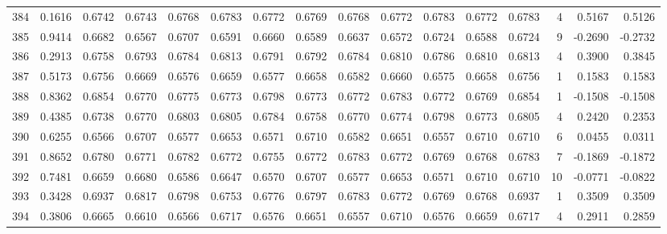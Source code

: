 \begin{tabular}{lrrrrrrrrrrrrrrr}
384 &      0.1616 &  0.6742 &  0.6743 &  0.6768 &  0.6783 &  0.6772 &  0.6769 &  0.6768 &  0.6772 &  0.6783 &   0.6772 &     0.6783 &      4 &                    0.5167 &                     0.5126 \\
385 &      0.9414 &  0.6682 &  0.6567 &  0.6707 &  0.6591 &  0.6660 &  0.6589 &  0.6637 &  0.6572 &  0.6724 &   0.6588 &     0.6724 &      9 &                   -0.2690 &                    -0.2732 \\
386 &      0.2913 &  0.6758 &  0.6793 &  0.6784 &  0.6813 &  0.6791 &  0.6792 &  0.6784 &  0.6810 &  0.6786 &   0.6810 &     0.6813 &      4 &                    0.3900 &                     0.3845 \\
387 &      0.5173 &  0.6756 &  0.6669 &  0.6576 &  0.6659 &  0.6577 &  0.6658 &  0.6582 &  0.6660 &  0.6575 &   0.6658 &     0.6756 &      1 &                    0.1583 &                     0.1583 \\
388 &      0.8362 &  0.6854 &  0.6770 &  0.6775 &  0.6773 &  0.6798 &  0.6773 &  0.6772 &  0.6783 &  0.6772 &   0.6769 &     0.6854 &      1 &                   -0.1508 &                    -0.1508 \\
389 &      0.4385 &  0.6738 &  0.6770 &  0.6803 &  0.6805 &  0.6784 &  0.6758 &  0.6770 &  0.6774 &  0.6798 &   0.6773 &     0.6805 &      4 &                    0.2420 &                     0.2353 \\
390 &      0.6255 &  0.6566 &  0.6707 &  0.6577 &  0.6653 &  0.6571 &  0.6710 &  0.6582 &  0.6651 &  0.6557 &   0.6710 &     0.6710 &      6 &                    0.0455 &                     0.0311 \\
391 &      0.8652 &  0.6780 &  0.6771 &  0.6782 &  0.6772 &  0.6755 &  0.6772 &  0.6783 &  0.6772 &  0.6769 &   0.6768 &     0.6783 &      7 &                   -0.1869 &                    -0.1872 \\
392 &      0.7481 &  0.6659 &  0.6680 &  0.6586 &  0.6647 &  0.6570 &  0.6707 &  0.6577 &  0.6653 &  0.6571 &   0.6710 &     0.6710 &     10 &                   -0.0771 &                    -0.0822 \\
393 &      0.3428 &  0.6937 &  0.6817 &  0.6798 &  0.6753 &  0.6776 &  0.6797 &  0.6783 &  0.6772 &  0.6769 &   0.6768 &     0.6937 &      1 &                    0.3509 &                     0.3509 \\
394 &      0.3806 &  0.6665 &  0.6610 &  0.6566 &  0.6717 &  0.6576 &  0.6651 &  0.6557 &  0.6710 &  0.6576 &   0.6659 &     0.6717 &      4 &                    0.2911 &                     0.2859 \\

\end{tabular}
